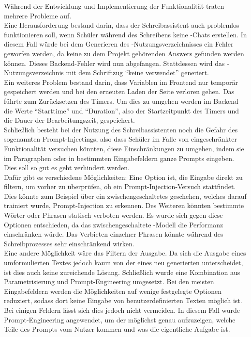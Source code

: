 \documentclass[../main.tex]{subfiles}
\begin{document}
Während der Entwicklung und Implementierung der Funktionalität traten mehrere Probleme auf.\\
Eine Herausforderung bestand darin, dass der Schreibassistent auch problemlos funktionieren soll, wenn Schüler während des Schreibens keine -Chats erstellen. In diesem Fall würde 
bei dem Generieren des -Nutzungsverzeichnisses ein Fehler geworfen werden, da keine zu dem Projekt gehörenden Answers gefunden werden können. Dieses Backend-Fehler wird nun 
abgefangen. Stattdessen wird  das -Nutzungsverzeichnis mit dem Schriftzug "`keine  verwendet"' generiert.\\
Ein weiteres Problem bestand darin, dass Variablen im Frontend nur temporär gespeichert werden und bei den erneuten Laden der Seite verloren gehen. Das führte zum Zurücksetzen des 
Timers. Um dies zu umgehen werden im Backend die Werte "`Starttime"' und "`Duration"', also der Startzeitpunkt des Timers und die Dauer der Bearbeitungszeit, gespeichert.\\ 
Schließlich besteht bei der Nutzung des Schreibassistenten noch die Gefahr des sogenannten Prompt-Injectings, also dass Schüler im Falle von eingeschränkter Funktionalität versuchen 
könnten, diese Einschränkungen zu umgehen, indem sie im Paragraphen oder in bestimmten Eingabefeldern ganze Prompts eingeben. Dies soll so gut es geht verhindert werden.\\ 
Dafür gibt es verschiedene Möglichkeiten: Eine Option ist, die Eingabe direkt zu filtern, um vorher zu überprüfen, ob ein Prompt-Injection-Versuch stattfindet. Dies könnte zum Beispiel 
über ein zwischengeschaltetes  geschehen, welches darauf trainiert wurde, Prompt-Injection zu erkennen. Des Weiteren könnten bestimmte Wörter oder Phrasen statisch verboten werden. 
Es wurde sich gegen diese Optionen entschieden, da das zwischengeschaltete -Modell die Performanz einschränken würde. Das Verbieten einzelner Phrasen könnte während des 
Schreibprozesses sehr einschränkend wirken.\cite{promptinjection}\\
Eine andere Möglichkeit wäre das Filtern der Ausgabe. Da sich die Ausgabe eines umformulierten Textes jedoch kaum von der eines neu generierten unterscheidet, ist dies auch keine 
zureichende Lösung. Schließlich wurde eine Kombination aus Parametrisierung und Prompt-Engineering umgesetzt. Bei den meisten Eingabefeldern werden die Möglichkeiten auf wenige 
festgelegte Optionen reduziert, sodass dort keine Eingabe von benutzerdefinierten Texten möglich ist. Bei einigen Feldern lässt sich dies jedoch nicht vermeiden. In diesem Fall wurde 
Prompt-Engineering angewendet, um der  möglichst genau aufzuzeigen, welche Teile des Prompts vom Nutzer kommen und was die eigentliche Aufgabe ist.\\
\end{document}

